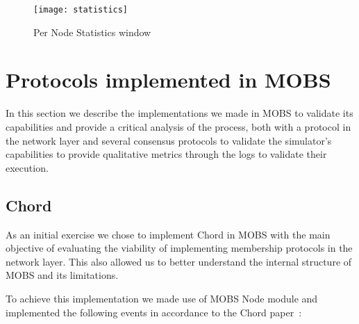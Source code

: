 \begin{figure}[h]
	\centering
	\texttt{[image: statistics]}
	\caption{Per Node Statistics window}
	\label{fig:statistics}
\end{figure}

\section{Protocols implemented in MOBS}\label{sub:protocols_implemented_in_mobs}
In this section we describe the implementations we made in MOBS to validate
its capabilities and provide a critical analysis of the process, both with a protocol in
the network layer and several consensus protocols to validate the simulator's capabilities to provide
qualitative metrics through the logs to validate their execution.

\subsection{Chord}\label{sub:chord_implementation}
As an initial exercise we chose to implement Chord in MOBS with the main objective of
evaluating the viability of implementing membership protocols in the network layer. This also
allowed us to better understand the internal structure of MOBS and its limitations.

To achieve this implementation we made use of MOBS Node module and implemented the
following events in accordance to the Chord paper~\cite{chord}:

